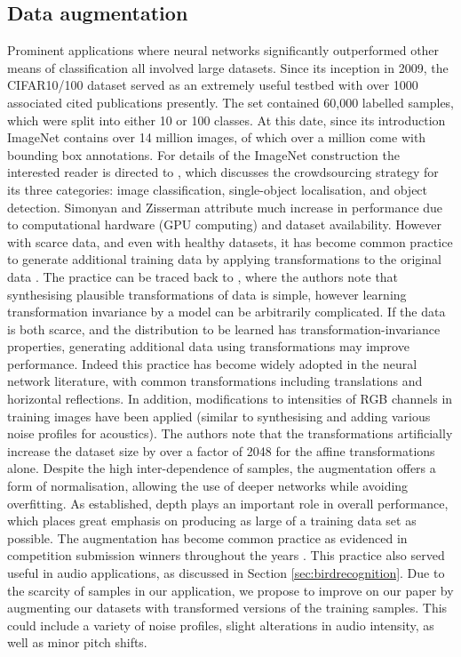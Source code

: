 \documentclass[12pt]{llncs}
\begin{document}
\subsection{Data augmentation}
Prominent applications where neural networks significantly outperformed other means of classification all involved large datasets. Since its inception in 2009, the CIFAR10/100 dataset \cite{krizhevsky2009learning} served as an extremely useful testbed with over 1000 associated cited publications presently. The set contained 60,000 labelled samples, which were split into either 10 or 100 classes. At this date, since its introduction ImageNet contains over 14 million images, of which over a million come with bounding box annotations. For details of the ImageNet construction the interested reader is directed to \cite[Section 3]{ILSVRC15}, which discusses the crowdsourcing strategy for its three categories: image classification, single-object localisation, and object detection. Simonyan and Zisserman \cite{simonyan2014very} attribute much increase in performance due to computational hardware (GPU computing) and dataset availability. However with scarce data, and even with healthy datasets, it has become common practice to generate additional training data by applying transformations to the original data \cite{hinton2012improving}. The practice can be traced back to \cite{simard2003best}, where the authors note that synthesising plausible transformations of data is simple, however learning transformation invariance by a model can be arbitrarily complicated. If the data is both scarce, and the distribution to be learned has transformation-invariance properties, generating additional data using transformations may improve performance. Indeed this practice has become widely adopted in the neural network literature, with common transformations including translations and horizontal reflections. In addition, modifications to intensities of RGB channels in training images \cite{krizhevsky2012imagenet} have been applied (similar to synthesising and adding various noise profiles for acoustics). The authors note that the transformations artificially increase the dataset size by over a factor of 2048 for the affine transformations alone. Despite the high inter-dependence of samples, the augmentation offers a form of normalisation, allowing the use of deeper networks while avoiding overfitting. As established, depth plays an important role in overall performance, which places great emphasis on producing as large of a training data set as possible. The augmentation has become common practice as evidenced in competition submission winners throughout the years \cite{simonyan2014very,he2016deep,krizhevsky2012imagenet}. This practice also served useful in audio applications, as discussed in Section \ref{sec:birdrecognition}. Due to the scarcity of samples in our application, we propose to improve on our paper by augmenting our datasets with transformed versions of the training samples. This could include a variety of noise profiles, slight alterations in audio intensity, as well as minor pitch shifts.
\end{document}
